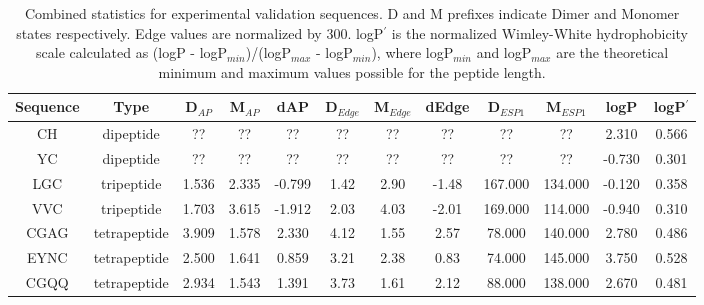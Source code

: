 \begin{table}[H]
    \centering
    \begin{tabular}{|c|c|c|c|c|c|c|c|c|c|c|c|}
        \hline
        Sequence & Type & D$_{AP}$ & M$_{AP}$ & dAP & D$_{Edge}$ & M$_{Edge}$ & dEdge & D$_{ESP1}$ & M$_{ESP1}$ & logP & logP$^\prime$ \\
        \hline
        CH & dipeptide & ?? & ?? & ?? & ?? & ?? & ?? & ?? & ?? & 2.310 & 0.566 \\
        YC & dipeptide & ?? & ?? & ?? & ?? & ?? & ?? & ?? & ?? & -0.730 & 0.301 \\
        LGC & tripeptide & 1.536 & 2.335 & -0.799 & 1.42 & 2.90 & -1.48 & 167.000 & 134.000 & -0.120 & 0.358 \\
        VVC & tripeptide & 1.703 & 3.615 & -1.912 & 2.03 & 4.03 & -2.01 & 169.000 & 114.000 & -0.940 & 0.310 \\
        CGAG & tetrapeptide & 3.909 & 1.578 & 2.330 & 4.12 & 1.55 & 2.57 & 78.000 & 140.000 & 2.780 & 0.486 \\
        EYNC & tetrapeptide & 2.500 & 1.641 & 0.859 & 3.21 & 2.38 & 0.83 & 74.000 & 145.000 & 3.750 & 0.528 \\
        CGQQ & tetrapeptide & 2.934 & 1.543 & 1.391 & 3.73 & 1.61 & 2.12 & 88.000 & 138.000 & 2.670 & 0.481 \\
        \hline
    \end{tabular}
    \caption{Combined statistics for experimental validation sequences. D and M prefixes indicate Dimer and Monomer states respectively. Edge values are normalized by 300. logP$^\prime$ is the normalized Wimley-White hydrophobicity scale calculated as (logP - logP$_{min}$)/(logP$_{max}$ - logP$_{min}$), where logP$_{min}$ and logP$_{max}$ are the theoretical minimum and maximum values possible for the peptide length.}
    \label{tab:exp_validation_round2}
\end{table}
